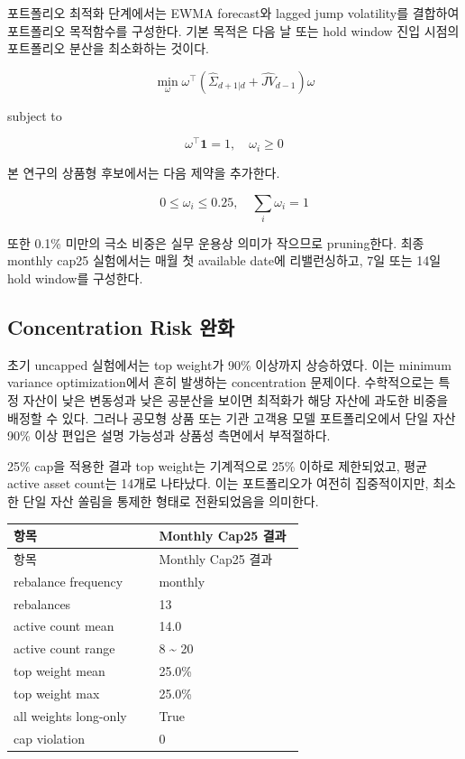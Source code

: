 \documentclass[12pt,a4paper]{article}
\begin{document}
포트폴리오 최적화 단계에서는 EWMA forecast와 lagged jump volatility를 결합하여 포트폴리오 목적함수를 구성한다. 기본 목적은 다음 날 또는 hold window 진입 시점의 포트폴리오 분산을 최소화하는 것이다.


\[
\min_{\omega}
\omega^\top
\left(
\widehat{\Sigma}_{d+1|d} + \widehat{JV}_{d-1}
\right)
\omega
\]

subject to

\[
\omega^\top \mathbf{1}=1,\quad \omega_i \ge 0
\]

본 연구의 상품형 후보에서는 다음 제약을 추가한다.


\[
0 \le \omega_i \le 0.25,\quad
\sum_i \omega_i=1
\]

또한 0.1\% 미만의 극소 비중은 실무 운용상 의미가 작으므로 pruning한다. 최종 monthly cap25 실험에서는 매월 첫 available date에 리밸런싱하고, 7일 또는 14일 hold window를 구성한다.

\subsection{Concentration Risk 완화}

초기 uncapped 실험에서는 top weight가 90\% 이상까지 상승하였다. 이는 minimum variance optimization에서 흔히 발생하는 concentration 문제이다. 수학적으로는 특정 자산이 낮은 변동성과 낮은 공분산을 보이면 최적화가 해당 자산에 과도한 비중을 배정할 수 있다. 그러나 공모형 상품 또는 기관 고객용 모델 포트폴리오에서 단일 자산 90\% 이상 편입은 설명 가능성과 상품성 측면에서 부적절하다.

25\% cap을 적용한 결과 top weight는 기계적으로 25\% 이하로 제한되었고, 평균 active asset count는 14개로 나타났다. 이는 포트폴리오가 여전히 집중적이지만, 최소한 단일 자산 쏠림을 통제한 형태로 전환되었음을 의미한다.

\begin{center}
\small
\begin{longtable}{@{}p{0.48\linewidth}p{0.48\linewidth}@{}}
\toprule
항목 & Monthly Cap25 결과 \\
\midrule
\endfirsthead
\toprule
항목 & Monthly Cap25 결과 \\
\midrule
\endhead
rebalance frequency & monthly \\
rebalances & 13 \\
active count mean & 14.0 \\
active count range & 8 \textasciitilde{} 20 \\
top weight mean & 25.0\% \\
top weight max & 25.0\% \\
all weights long-only & True \\
cap violation & 0 \\
\bottomrule
\end{longtable}
\end{center}
\end{document}
